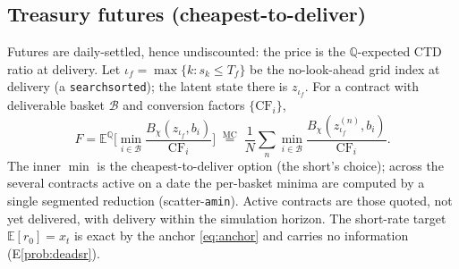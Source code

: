 \documentclass[11pt]{article}
\newcommand{\QQ}{\mathbb{Q}}
\newcommand{\E}{\mathbb{E}}
\newcommand{\cf}{\mathrm{CF}}
\begin{document}
\subsection{Treasury futures (cheapest-to-deliver)}
Futures are daily-settled, hence undiscounted: the price is the $\QQ$-expected
CTD ratio at delivery. Let $\iota_f=\max\{k:s_k\le T_f\}$ be the no-look-ahead
grid index at delivery (a \texttt{searchsorted}); the latent state there is
$z_{\iota_f}$. For a contract with deliverable basket $\mathcal B$ and
conversion factors $\{\cf_i\}$,
\begin{equation}
F=\E^{\QQ}\!\Big[\min_{i\in\mathcal B}\frac{B_\chi(z_{\iota_f},b_i)}{\cf_i}\Big]
\;\overset{\text{MC}}{=}\;
\frac1N\sum_{n}\min_{i\in\mathcal B}\frac{B_\chi(z^{(n)}_{\iota_f},b_i)}{\cf_i}.
\label{eq:futures}
\end{equation}
The inner $\min$ is the cheapest-to-deliver option (the short's choice);
across the several contracts active on a date the per-basket minima are
computed by a single segmented reduction (scatter-\texttt{amin}). Active
contracts are those quoted, not yet delivered, with delivery within the
simulation horizon. The short-rate target $\E[r_0]=x_t$ is exact by the anchor
\eqref{eq:anchor} and carries no information (E\ref{prob:deadsr}).

\end{document}
